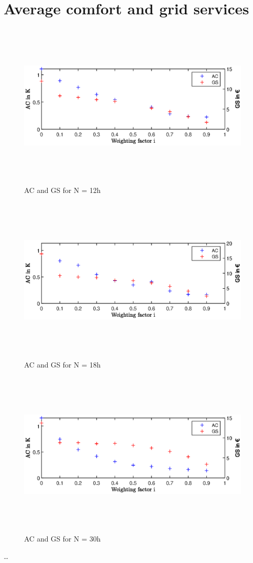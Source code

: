 \setcounter{figure}{0}
\section{Average comfort and grid services}
\label{sec:Average comfort and grid services}
\begin{figure}[H]
            \centering
            \includegraphics[width=15cm,height=8cm]{figure/AC_und_GS_12h.eps}
           \caption{AC and GS for N = 12h}
            \label{fig:AC_und_GS_12h}
    \end{figure}
    \begin{figure}[H]
            \centering
            \includegraphics[width=15cm,height=8cm]{figure/AC_und_GS_18h.eps}
           \caption{AC and GS for N = 18h}
            \label{fig:AC_und_GS_18h}
    \end{figure}
     \begin{figure}[H]
            \centering
            \includegraphics[width=15cm,height=8cm]{figure/AC_und_GS_30h.eps}
           \caption{AC and GS for N = 30h}
            \label{fig:AC_und_GS_30h}
    \end{figure}  		



\dots
